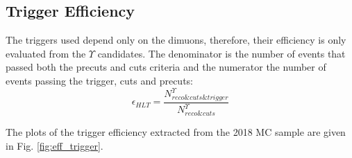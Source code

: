 \subsection{Trigger Efficiency}

The triggers used depend only on the dimuons, therefore, their efficiency is only evaluated from the $\Upsilon$ candidates. The denominator is the number of events that passed both the precuts and cuts criteria and the numerator the number of events passing the trigger, cuts and precuts:
\begin{equation}
  \epsilon_{HLT} = \frac{N_{reco\&cuts\&trigger}^\Upsilon}{N_{reco\&cuts}^\Upsilon}
\end{equation}

The plots of the trigger efficiency extracted from the 2018 MC sample are given in Fig. \ref{fig:eff_trigger}.

